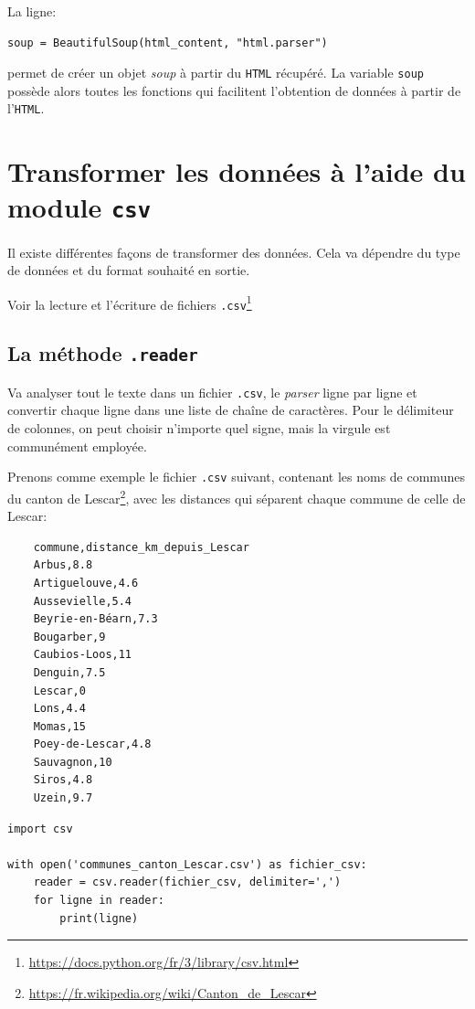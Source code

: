 \documentclass[a4paper,11pt]{book}
\begin{document}
La ligne:
\begin{lstlisting}
soup = BeautifulSoup(html_content, "html.parser")
\end{lstlisting}
permet de créer un objet \og \textit{soup}\fg{} à partir du \texttt{HTML} récupéré. La variable \texttt{soup} possède alors toutes les fonctions qui facilitent l'obtention de données à partir de l'\texttt{HTML}.
\medskip 

\section{Transformer les données à l'aide du module \texttt{csv}}
Il existe différentes façons de transformer des données. Cela va dépendre du type de données et du format souhaité en sortie.
\medskip

Voir la lecture et l'écriture de fichiers \texttt{.csv}\footnote{\url{https://docs.python.org/fr/3/library/csv.html}}
\medskip

\subsection*{La méthode \texttt{.reader}}
Va analyser tout le texte dans un fichier \texttt{.csv}, le \textit{parser} ligne par ligne et convertir chaque ligne dans une liste de chaîne de caractères. Pour le délimiteur de colonnes, on peut choisir n'importe quel signe, mais la virgule est communément employée.
\medskip

Prenons comme exemple le fichier \texttt{.csv} suivant, contenant les noms de communes du canton de Lescar\footnote{\url{https://fr.wikipedia.org/wiki/Canton_de_Lescar}}, avec les distances qui séparent chaque commune de celle de Lescar:
\begin{verbatim}
    commune,distance_km_depuis_Lescar
    Arbus,8.8 
    Artiguelouve,4.6
    Aussevielle,5.4
    Beyrie-en-Béarn,7.3
    Bougarber,9
    Caubios-Loos,11
    Denguin,7.5
    Lescar,0
    Lons,4.4
    Momas,15
    Poey-de-Lescar,4.8
    Sauvagnon,10
    Siros,4.8
    Uzein,9.7
\end{verbatim}
\medskip

\begin{lstlisting}[caption=La méthode \texttt{.reader()}]
import csv

with open('communes_canton_Lescar.csv') as fichier_csv:
    reader = csv.reader(fichier_csv, delimiter=',')
    for ligne in reader:
        print(ligne)
\end{lstlisting}
\medskip
\end{document}
